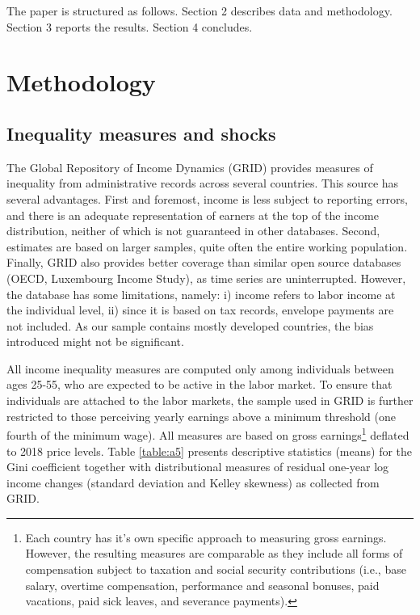 \documentclass[12pt, a4paper]{article}
\begin{document}
The paper is structured as follows. Section 2 describes data and methodology. Section 3 reports the results. Section 4 concludes.


\section{Methodology}

\subsection{Inequality measures and shocks} 
The Global Repository of Income Dynamics (GRID) provides measures of inequality from administrative records across several countries. This source has several advantages. First and foremost, income is less subject to reporting errors, and there is an adequate representation of earners at the top of the income distribution, neither of which is not guaranteed in other databases. Second, estimates are based on larger samples, quite often the entire working population. Finally, GRID also provides better coverage than similar open source databases (OECD, Luxembourg Income Study), as time series are uninterrupted. However, the database has some limitations, namely: i) income refers to labor income at the individual level, ii) since it is based on tax records, envelope payments are not included. As our sample contains mostly developed countries, the bias introduced might not be significant.

All income inequality measures are computed only among individuals between ages 25-55, who are expected to be active in the labor market. To ensure that individuals are attached to the labor markets, the sample used in GRID is further restricted to those perceiving yearly earnings above a minimum threshold (one fourth of the minimum wage). All measures are based on gross earnings\footnote{Each country has it's own specific approach to measuring gross earnings. However, the resulting measures are comparable as they include all forms of compensation subject to taxation and social security contributions (i.e., base salary, overtime compensation, performance and seasonal bonuses, paid vacations, paid sick leaves, and severance payments).} deflated to 2018 price levels. Table \ref{table:a5} presents descriptive statistics (means) for the Gini coefficient together with distributional measures of residual one-year log income changes (standard deviation and Kelley skewness) as collected from GRID.
\end{document}
